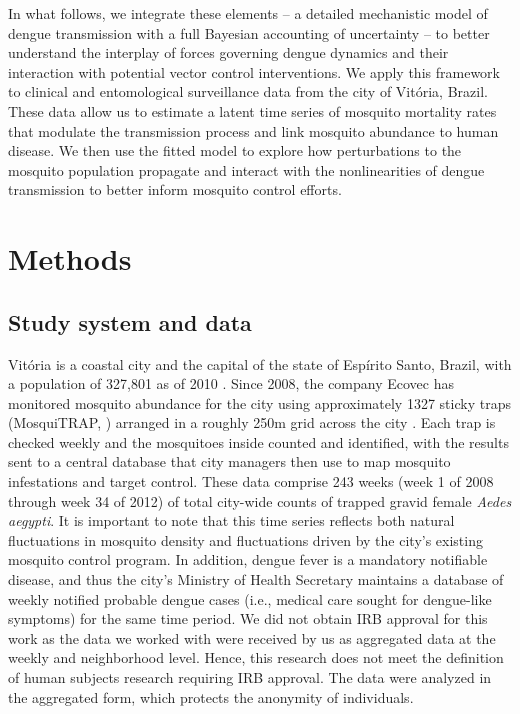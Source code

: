 \documentclass[10pt,letterpaper]{article}
\begin{document}
In what follows, we integrate these elements -- a detailed mechanistic model of dengue transmission with a full Bayesian accounting of uncertainty --  to better understand the interplay of forces governing dengue dynamics and their interaction with potential vector control interventions.
We apply this framework to clinical and entomological surveillance data from the city of Vit\'oria, Brazil.
These data allow us to estimate a latent time series of mosquito mortality rates that modulate the transmission process and link mosquito abundance to human disease.  
We then use the fitted model to explore how perturbations to the mosquito population propagate and interact with the nonlinearities of dengue transmission to better inform mosquito control efforts.

\section*{Methods}

\subsection*{Study system and data}

Vit\'oria is a coastal city and the capital of the state of Esp\'irito Santo, Brazil, with a population of 327,801 as of 2010 \cite{vitpop}.
Since 2008, the company Ecovec has monitored mosquito abundance for the city using approximately 1327 sticky traps (MosquiTRAP, \cite{Eiras2009}) arranged in a roughly 250m grid across the city \cite{Pepin2015, Lana2018}.
Each trap is checked weekly and the mosquitoes inside counted and identified, with the results sent to a central database that city managers then use to map mosquito infestations and target control.
These data comprise 243 weeks (week 1 of 2008 through week 34 of 2012) of total city-wide counts of trapped gravid female \emph{Aedes aegypti}.
It is important to note that this time series reflects both natural fluctuations in mosquito density and fluctuations driven by the city's existing mosquito control program.
In addition, dengue fever is a mandatory notifiable disease, and thus the city's Ministry of Health Secretary maintains a database of weekly notified probable dengue cases (i.e., medical care sought for dengue-like symptoms) for the same time period.
We did not obtain IRB approval for this work as the data we worked with were received by us as aggregated data at the weekly and neighborhood level.  
Hence, this research does not meet the definition of human subjects research requiring IRB approval.  
The data were analyzed in the aggregated form, which protects the anonymity of individuals.
\end{document}
